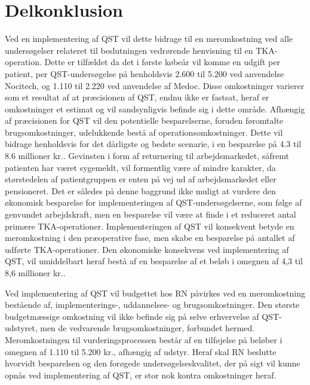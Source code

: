 \section{Delkonklusion}
Ved en implementering af QST vil dette bidrage til en meromkostning ved alle undersøgelser relateret til beslutningen vedrørende henvisning til en TKA-operation. Dette er tilfældet da det i første købeår vil komme en udgift per patient, per QST-undersøgelse på henholdsvis 2.600 til 5.200 ved anvendelse Nocitech, og 1.110 til 2.220 ved anvendelse af Medoc. Disse omkostninger varierer som et resultat af at præcisionen af QST, endnu ikke er fastsat, heraf er omkostninger et estimat og vil sandsynligvis befinde sig i dette område. Afhængig af præcisionen for QST vil den potentielle besparelserne, foruden føromtalte brugsomkostninger, udelukkende bestå af operationsomkostninger. Dette vil bidrage henholdsvis for det dårligste og bedste scenarie, i en besparelse på 4.3 til 8.6 millioner kr.. Gevinsten i form af returnering til arbejdsmarkedet, såfremt patienten har været sygemeldt, vil formentlig være af mindre karakter, da størstedelen af patientgruppen er enten på vej ud af arbejdsmarkedet eller pensioneret. Det er således på denne baggrund ikke muligt at vurdere den økonomisk besparelse for implementeringen af QST-undersøgelserne, som følge af genvundet arbejdskraft, men en besparelse vil være at finde i et reduceret antal primære TKA-operationer. Implementeringen af QST vil konsekvent betyde en meromkostning i den præoperative fase, men skabe en besparelse på antallet af udførte TKA-operationer. Den økonomiske konsekvens ved implementering af QST, vil umiddelbart heraf bestå af en besparelse af et beløb i omegnen af 4,3 til 8,6 millioner kr..

Ved implementering af QST vil budgettet hos RN påvirkes ved en meromkostning bestående af, implementerings-, uddannelses- og brugsomkostninger. Den største budgetmæssige omkostning vil ikke befinde sig på selve erhvervelse af QST-udstyret, men de vedvarende brugsomkostninger, forbundet hermed. Meromkostningen til vurderingsprocessen består af en tilføjelse på beløber i omegnen af 1.110 til 5.200 kr., afhængig af udstyr. Heraf skal RN beslutte hvorvidt besparelsen og den forøgede undersøgelseskvalitet, der på sigt vil kunne opnås ved implementering af QST, er stor nok kontra omkostninger heraf. 